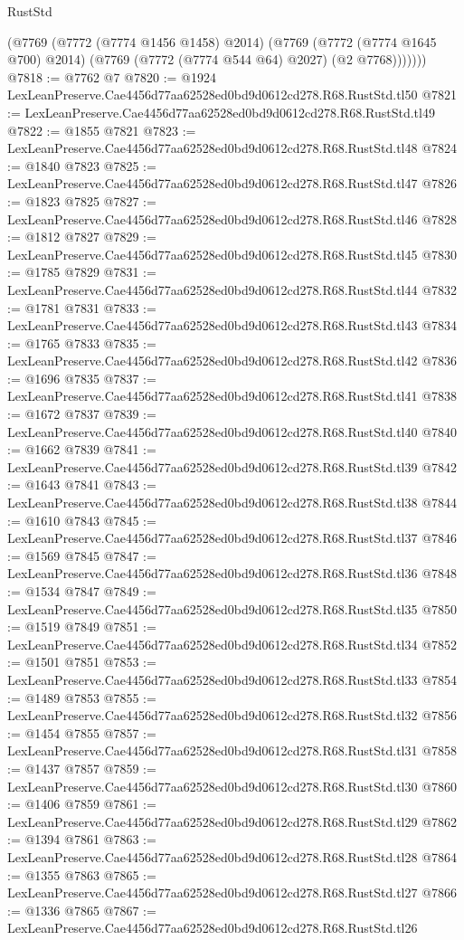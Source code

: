 \begin{lexlean}{RustStd}
\begin{coremodule}
          (@7769
            (@7772 (@7774 @1456 @1458) @2014)
            (@7769
              (@7772 (@7774 @1645 @700) @2014)
              (@7769 (@7772 (@7774 @544 @64) @2027) (@2 @7768)))))))
@7818 := @7762 @7
@7820 := @1924 LexLeanPreserve.Cae4456d77aa62528ed0bd9d0612cd278.R68.RustStd.tl50
@7821 := LexLeanPreserve.Cae4456d77aa62528ed0bd9d0612cd278.R68.RustStd.tl49
@7822 := @1855 @7821
@7823 := LexLeanPreserve.Cae4456d77aa62528ed0bd9d0612cd278.R68.RustStd.tl48
@7824 := @1840 @7823
@7825 := LexLeanPreserve.Cae4456d77aa62528ed0bd9d0612cd278.R68.RustStd.tl47
@7826 := @1823 @7825
@7827 := LexLeanPreserve.Cae4456d77aa62528ed0bd9d0612cd278.R68.RustStd.tl46
@7828 := @1812 @7827
@7829 := LexLeanPreserve.Cae4456d77aa62528ed0bd9d0612cd278.R68.RustStd.tl45
@7830 := @1785 @7829
@7831 := LexLeanPreserve.Cae4456d77aa62528ed0bd9d0612cd278.R68.RustStd.tl44
@7832 := @1781 @7831
@7833 := LexLeanPreserve.Cae4456d77aa62528ed0bd9d0612cd278.R68.RustStd.tl43
@7834 := @1765 @7833
@7835 := LexLeanPreserve.Cae4456d77aa62528ed0bd9d0612cd278.R68.RustStd.tl42
@7836 := @1696 @7835
@7837 := LexLeanPreserve.Cae4456d77aa62528ed0bd9d0612cd278.R68.RustStd.tl41
@7838 := @1672 @7837
@7839 := LexLeanPreserve.Cae4456d77aa62528ed0bd9d0612cd278.R68.RustStd.tl40
@7840 := @1662 @7839
@7841 := LexLeanPreserve.Cae4456d77aa62528ed0bd9d0612cd278.R68.RustStd.tl39
@7842 := @1643 @7841
@7843 := LexLeanPreserve.Cae4456d77aa62528ed0bd9d0612cd278.R68.RustStd.tl38
@7844 := @1610 @7843
@7845 := LexLeanPreserve.Cae4456d77aa62528ed0bd9d0612cd278.R68.RustStd.tl37
@7846 := @1569 @7845
@7847 := LexLeanPreserve.Cae4456d77aa62528ed0bd9d0612cd278.R68.RustStd.tl36
@7848 := @1534 @7847
@7849 := LexLeanPreserve.Cae4456d77aa62528ed0bd9d0612cd278.R68.RustStd.tl35
@7850 := @1519 @7849
@7851 := LexLeanPreserve.Cae4456d77aa62528ed0bd9d0612cd278.R68.RustStd.tl34
@7852 := @1501 @7851
@7853 := LexLeanPreserve.Cae4456d77aa62528ed0bd9d0612cd278.R68.RustStd.tl33
@7854 := @1489 @7853
@7855 := LexLeanPreserve.Cae4456d77aa62528ed0bd9d0612cd278.R68.RustStd.tl32
@7856 := @1454 @7855
@7857 := LexLeanPreserve.Cae4456d77aa62528ed0bd9d0612cd278.R68.RustStd.tl31
@7858 := @1437 @7857
@7859 := LexLeanPreserve.Cae4456d77aa62528ed0bd9d0612cd278.R68.RustStd.tl30
@7860 := @1406 @7859
@7861 := LexLeanPreserve.Cae4456d77aa62528ed0bd9d0612cd278.R68.RustStd.tl29
@7862 := @1394 @7861
@7863 := LexLeanPreserve.Cae4456d77aa62528ed0bd9d0612cd278.R68.RustStd.tl28
@7864 := @1355 @7863
@7865 := LexLeanPreserve.Cae4456d77aa62528ed0bd9d0612cd278.R68.RustStd.tl27
@7866 := @1336 @7865
@7867 := LexLeanPreserve.Cae4456d77aa62528ed0bd9d0612cd278.R68.RustStd.tl26

\end{coremodule}
\end{lexlean}
